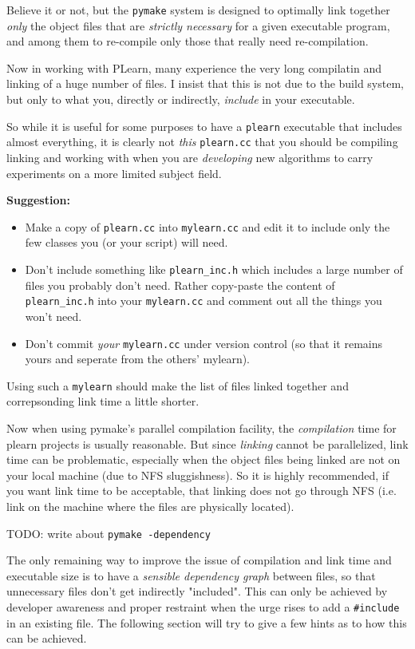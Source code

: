 \documentclass[11pt]{book}
\begin{document}
Believe it or not, but the {\tt pymake} system is designed to optimally link
together {\em only} the object files that are {\em strictly necessary} for
a given executable program, and among them to re-compile only those that really
need re-compilation.

Now in working with PLearn, many experience the very long compilatin and
linking of a huge number of files. I insist that this is not due to the
build system, but only to what you, directly or indirectly, {\em include}
in your executable.

So while it is useful for some purposes to have a {\tt plearn} executable that
includes almost everything, it is clearly not {\em this} {\tt plearn.cc} that you
should be compiling linking and working with when you are {\em developing} new
algorithms to carry experiments on a more limited subject field.

{\bf Suggestion:} 
\begin{itemize}
\item Make a copy of {\tt plearn.cc} into {\tt mylearn.cc} and edit it to
include only the few classes you (or your script) will need.
\item Don't include something like {\tt plearn\_inc.h} which includes a large number of
files you probably don't need. Rather copy-paste the content of {\tt
plearn\_inc.h} into your {\tt mylearn.cc} and comment out all the things
you won't need.
\item Don't commit {\em your} {\tt mylearn.cc} under version control (so
  that it remains yours and seperate from the others' mylearn).
\end{itemize}

Using such a {\tt mylearn} should make the list of files linked together
and correpsonding link time a little shorter.

Now when using pymake's parallel compilation facility, the {\em
compilation} time for plearn projects is usually reasonable. But since {\em
linking} cannot be parallelized, link time can be problematic, especially
when the object files being linked are not on your local machine (due to
NFS sluggishness). So it is highly recommended, if you want link time to be
acceptable, that linking does not go through NFS (i.e. link on the machine
where the files are physically located).

TODO: write about {\tt pymake -dependency}

The only remaining way to improve the issue of compilation and link time
and executable size is to have a {\em sensible dependency graph} between
files, so that unnecessary files don't get indirectly "included". This can
only be achieved by developer awareness and proper restraint when the urge
rises to add a {\tt \#include} in an existing file. The following section
will try to give a few hints as to how this can be achieved.
\end{document}
